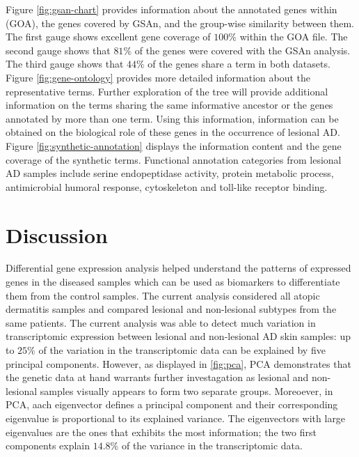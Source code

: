 \documentclass[journal, a4paper]{IEEEtran}
\begin{document}
Figure \ref{fig:gsan-chart} provides information about the annotated genes within (GOA), the genes covered by GSAn, and the group-wise similarity between them. The first gauge shows excellent gene coverage of $100\%$ within the GOA file. The second gauge shows that $81\%$ of the genes were covered with the GSAn analysis. The third gauge shows that $44\%$ of the genes share a term in both datasets.\\


Figure \ref{fig:gene-ontology} provides more detailed information about the representative terms. Further exploration of the tree will provide additional information on the terms sharing the same informative ancestor or the genes annotated by more than one term. Using this information, information can be obtained on the biological role of these genes in the occurrence of lesional AD.\\

Figure \ref{fig:synthetic-annotation} displays the information content and the gene coverage of the synthetic terms. Functional annotation categories from lesional AD samples include serine endopeptidase activity, protein metabolic process, antimicrobial humoral response, cytoskeleton and toll-like receptor binding.\\



\section{\textbf{Discussion}}

Differential gene expression analysis helped understand the patterns of expressed genes in the diseased samples which can be used as biomarkers to differentiate them from the control samples. The current analysis considered all atopic dermatitis samples and compared lesional and non-lesional subtypes from the same patients. The current analysis was able to detect much variation in transcriptomic expression between lesional and non-lesional AD skin samples: up to $25\%$ of the variation in the transcriptomic data can be explained by five principal components. However, as displayed in \ref{fig:pca}, PCA demonstrates that the genetic data at hand warrants further investagation as lesional and non-lesional samples visually appears to form two separate groups. Moreoever, in PCA, aach eigenvector defines a principal component and their corresponding eigenvalue is proportional to its explained variance. The eigenvectors with large eigenvalues are the ones that exhibits the most information; the two first components explain $14.8\%$ of the variance in the transcriptomic data.\\%
\end{document}
